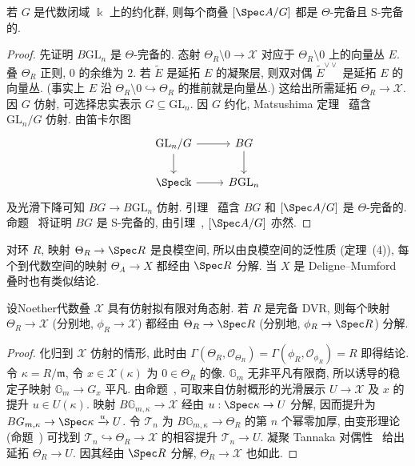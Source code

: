 \begin{proposition}\label{src:7.9.20}
若 $G$ 是代数闭域 $\Bbbk$ 上的约化群, 则每个商叠 $[\Spec A/G]$ 都是 $\Theta$-完备且 S-完备的.
\end{proposition}
\begin{proof}
先证明 $B\mathrm{GL}_n$ 是 $\Theta$-完备的. 态射 $\Theta_R\setminus0\to\mathcal X$ 对应于 $\Theta_R\setminus0$ 上的向量丛 $E$. 叠 $\Theta_R$ 正则, $0$ 的余维为 $2$. 若 $\widetilde E$ 是延拓 $E$ 的凝聚层, 则双对偶 $\widetilde E^{\vee\vee}$ 是延拓 $E$ 的向量丛. (事实上 $E$ 沿 $\Theta_R\setminus0\hookrightarrow\Theta_R$ 的推前就是向量丛.) 这给出所需延拓 $\Theta_R\to\mathcal X$. 因 $G$ 仿射, 可选择忠实表示 $G\subseteq\mathrm{GL}_n$. 因 $G$ 约化, Matsushima 定理~ 蕴含 $\mathrm{GL}_n/G$ 仿射. 由笛卡尔图
\[\begin{tikzcd}[ampersand replacement=\&]\mathrm{GL}_n/G\arrow[r]\arrow[d]\&BG\arrow[d]\\\Spec\Bbbk\arrow[r]\&B\mathrm{GL}_n\end{tikzcd}\]
及光滑下降可知 $BG\to B\mathrm{GL}_n$ 仿射. 引理~ 蕴含 $BG$ 和 $[\Spec A/G]$ 是 $\Theta$-完备的. 命题~ 将证明 $BG$ 是 S-完备的, 由引理~, $[\Spec A/G]$ 亦然.
\end{proof}
对环 $R$, 映射 $\Theta_R\to\Spec R$ 是良模空间, 所以由良模空间的泛性质 (定理~(4)), 每个到代数空间的映射 $\Theta_A\to X$ 都经由 $\Spec R$ 分解. 当 $X$ 是 Deligne--Mumford 叠时也有类似结论.
\begin{lemma}\label{src:7.9.21}
设Noether代数叠 $\mathcal X$ 具有仿射拟有限对角态射. 若 $R$ 是完备 DVR, 则每个映射 $\Theta_R\to\mathcal X$ (分别地, $\phi_R\to\mathcal X$) 都经由 $\Theta_R\to\Spec R$ (分别地, $\phi_R\to\Spec R$) 分解.
\end{lemma}
\begin{proof}
化归到 $\mathcal X$ 仿射的情形, 此时由 $\Gamma(\Theta_R,\mathcal O_{\Theta_R})=\Gamma(\phi_R,\mathcal O_{\phi_R})=R$ 即得结论. 令 $\kappa=R/\mathfrak m$, 令 $x\in\mathcal X(\kappa)$ 为 $0\in\Theta_R$ 的像. $\mathbb G_m$ 无非平凡有限商, 所以诱导的稳定子映射 $\mathbb G_m\to G_x$ 平凡. 由命题~, 可取来自仿射概形的光滑展示 $U\to\mathcal X$ 及 $x$ 的提升 $u\in U(\kappa)$. 映射 $B\mathbb G_{m,\kappa}\to\mathcal X$ 经由 $u:\Spec\kappa\to U$ 分解, 因而提升为 $B\mathbb G_{m,\kappa}\to\Spec\kappa\xrightarrow{u}U$. 令 $\mathcal T_n$ 为 $B\mathbb G_{m,\kappa}\to\Theta_R$ 的第 $n$ 个幂零加厚, 由变形理论 (命题~) 可找到 $\mathcal T_n\hookrightarrow\Theta_R\to\mathcal X$ 的相容提升 $\mathcal T_n\to U$. 凝聚 Tannaka 对偶性~ 给出延拓 $\Theta_R\to U$. 因其经由 $\Spec R$ 分解, $\Theta_R\to\mathcal X$ 也如此.
\end{proof}
